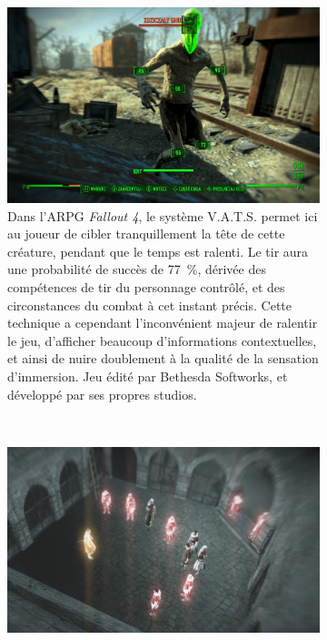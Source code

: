 	\begin{figure}[htb]
		\begin{subfigure}[t]{0.46\textwidth}
		\centering
		\includegraphics[width=\textwidth]{figures/ch1/f4vats}
		\caption[Système V.A.T.S permettant de faciliter les tirs dans \emph{Fallout 4}]{Dans l'ARPG \emph{Fallout 4}, le système V.A.T.S. permet ici au joueur de cibler tranquillement la tête de cette créature, pendant que le temps est ralenti. Le tir aura une probabilité de succès de 77~\%{}, dérivée des compétences de tir du personnage contrôlé, et des circonstances du combat à cet instant précis. Cette technique a cependant l'inconvénient majeur de ralentir le jeu, d'afficher beaucoup d'informations contextuelles, et ainsi de nuire doublement à la qualité de la sensation d'immersion. Jeu édité par Bethesda Softworks, et développé par ses propres studios.}
		\label{fig:f4vats}
		\end{subfigure}
		~
		\begin{subfigure}[t]{0.54\textwidth}
		\centering
		\includegraphics[width=\textwidth]{figures/ch1/assassin}

\end{subfigure}
\end{figure}
